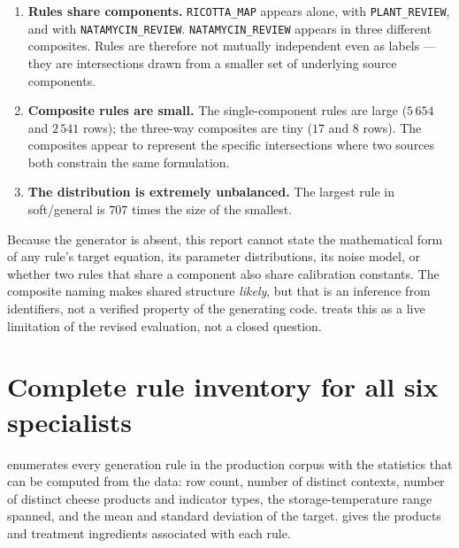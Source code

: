 \begin{enumerate}[leftmargin=1.5em, itemsep=2pt]
\item \textbf{Rules share components.} \texttt{RICOTTA\_MAP} appears alone,
  with \texttt{PLANT\_REVIEW}, and with \texttt{NATAMYCIN\_REVIEW}.
  \texttt{NATAMYCIN\_REVIEW} appears in three different composites. Rules
  are therefore not mutually independent even as labels --- they are
  intersections drawn from a smaller set of underlying source components.
\item \textbf{Composite rules are small.} The single-component rules are
  large ($5\,654$ and $2\,541$ rows); the three-way composites are tiny
  ($17$ and $8$ rows). The composites appear to represent the specific
  intersections where two sources both constrain the same formulation.
\item \textbf{The distribution is extremely unbalanced.} The largest rule
  in soft/general is $707$ times the size of the smallest.
\end{enumerate}

\begin{limitbox}[title=What cannot be said]
Because the generator is absent, this report cannot state the mathematical
form of any rule's target equation, its parameter distributions, its noise
model, or whether two rules that share a component also share calibration
constants. The composite naming makes shared structure \emph{likely}, but
that is an inference from identifiers, not a verified property of the
generating code.  treats this as a live limitation of the
revised evaluation, not a closed question.
\end{limitbox}

\section{Complete rule inventory for all six specialists}

 enumerates every generation rule in the
production corpus with the statistics that can be computed from the data:
row count, number of distinct contexts, number of distinct cheese products
and indicator types, the storage-temperature range spanned, and the mean
and standard deviation of the target.  gives
the products and treatment ingredients associated with each rule.


